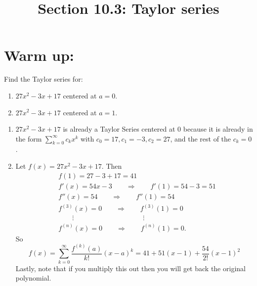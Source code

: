 \documentclass[handout]{ximera}
\title{Section 10.3: Taylor series}
\begin{document}
\begin{abstract}		\end{abstract}
\maketitle



\section{Warm up:}
Find the Taylor series for:  
	\begin{enumerate}
	\item $27x^2 - 3x + 17$ centered at $a=0$.  
	\item  $27x^2 - 3x + 17$ centered at $a=1$.  
	\end{enumerate}
	
	\begin{freeResponse}
	\begin{enumerate}
	\item
	$27x^2 - 3x + 17$ is already a Taylor Series centered at 0 because it is already in the form $\sum_{k=0}^\infty c_k x^k$ with $c_0=17, c_1=-3, c_2=27$, and the rest of the $c_k=0$.
	
	\item  
	Let $f(x) = 27x^2-3x+17$.  Then
		\begin{align*}
		&f(1) = 27 - 3 + 17 = 41  \\
		&f'(x) = 54x - 3 	\qquad \Longrightarrow 	\qquad	f'(1) = 54-3=51  \\
		&f''(x) = 54 		\qquad	\Longrightarrow	\qquad f''(1) = 54  \\
		&f^{(3)}(x) = 0 	\qquad	\Longrightarrow	\qquad f^{(3)}(1) = 0  \\
		&\qquad \vdots 	\qquad	\qquad	\qquad \qquad \qquad	\vdots  \\
		&f^{(n)}(x) = 0	\qquad	\Longrightarrow	\qquad	f^{(n)}(1) = 0.
		\end{align*}
	So
		\[
		f(x) = \sum_{k=0}^\infty \frac{f^{(k)}(a)}{k!}(x-a)^k = \boxed{41 + 51(x-1) + \frac{54}{2!}(x-1)^2}
		\]
	Lastly, note that if you multiply this out then you will get back the original polynomial.
	
	
	

	
	\end{enumerate}
	\end{freeResponse}
	
\end{document}
